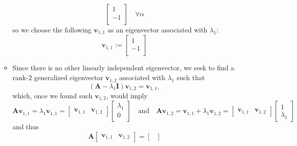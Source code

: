 \documentclass[12pt,a4paper]{article}
\begin{document}
\begin{itemize}
\begin{itemize}
\begin{equation}
\begin{bmatrix}
        1 \\
        -1 \\
      \end{bmatrix}
      \quad \forall \alpha
    \end{equation}
    so we choose the following $\bm{v}_{1,1}$ as an eigenvector associated with $\lambda_{1}$:
    \begin{equation}\nonumber%
      \bm{v}_{1,1} :=
      \begin{bmatrix}
        1 \\
        -1 \\
      \end{bmatrix}
    \end{equation}
  \item Since there is no other linearly independent eigenvector,
    we seek to find a rank-$2$ generalized eigenvector $\bm{v}_{1,2}$ associated with $\lambda_{1}$
    such that
    \begin{equation}\nonumber%
      (\bm{A}-\lambda_{1}\bm{I})\bm{v}_{1,2}=\bm{v}_{1,1},
    \end{equation}
    which, once we found such $\bm{v}_{1,2}$, would imply
    \begin{equation}\nonumber%
      \bm{A}\bm{v}_{1,1} = \lambda_{1}\bm{v}_{1,1}
      =
      \begin{bmatrix}
        \bm{v}_{1,1} & \bm{v}_{1,2}
      \end{bmatrix}
      \begin{bmatrix}
        \lambda_{1}\\
        0 \\
      \end{bmatrix}
      \quad\text{and}\quad
      \bm{A}\bm{v}_{1,2} = \bm{v}_{1,1} + \lambda_{1}\bm{v}_{1,2}
      =
      \begin{bmatrix}
        \bm{v}_{1,1} & \bm{v}_{1,2}
      \end{bmatrix}
      \begin{bmatrix}
        1 \\
        \lambda_{1}
      \end{bmatrix}
    \end{equation}
    and thus
    \begin{equation}\nonumber%
      \bm{A}
      \begin{bmatrix}
        \bm{v}_{1,1} & \bm{v}_{1,2}
      \end{bmatrix}
      =
      \begin{bmatrix}

\end{bmatrix}
\end{equation}
\end{itemize}
\end{itemize}
\end{document}
